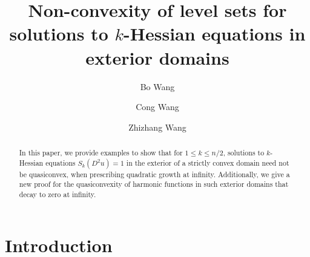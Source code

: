 \documentclass[reqno]{amsart}
\theoremstyle{remark}
\theoremstyle{definition}
\numberwithin{equation}{section}
\begin{document}
\title[Non-convexity of level sets]
{Non-convexity of level sets for solutions to $k$-Hessian equations in exterior domains}

\author[B. Wang]{Bo Wang}
\address[B. Wang]{School of Mathematics and Statistics\\
Beijing Institute of Technology\\
100081 Beijing\\
P.R. China}

\author[C. Wang]{Cong Wang}
\address[C. Wang]{School of Statistics\\
University of International Business and Economics\\
100029 Beijing\\
P.R. China}

\author[Z. Wang]{Zhizhang Wang}
\address[Z. Wang]{School of Mathematical Science\\
Fudan University\\
200433 Shanghai\\
P.R. China}



\begin{abstract}
	In this paper, we provide examples to show that for $1 \leq k \leq n/2$, solutions to $k$-Hessian equations $S_k(D^2u)=1$ in the exterior of a strictly convex domain need not be quasiconvex, when prescribing quadratic growth at infinity. Additionally, we give a new proof for the quasiconvexity of harmonic functions in such exterior domains that decay to zero at infinity.
\end{abstract}

\maketitle 
  
\section{Introduction}
\end{document}
